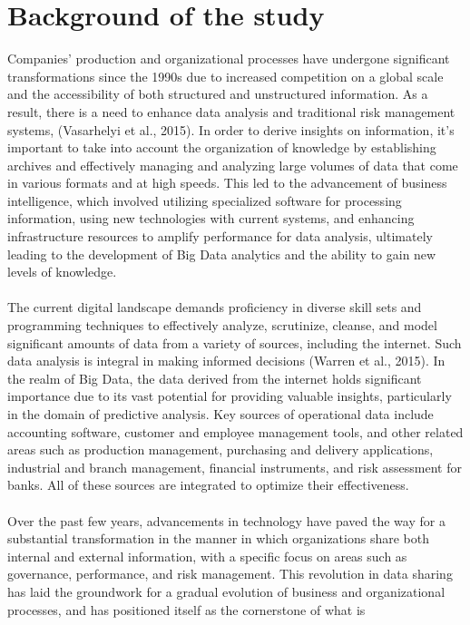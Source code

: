 \section{Background of the study}

Companies' production and organizational processes have undergone significant
transformations since the 1990s due to increased competition on a global scale and the
accessibility of both structured and unstructured information. As a result, there is a need to
enhance data analysis and traditional risk management systems, (Vasarhelyi et al., 2015). In order
to derive insights on information, it's important to take into account the organization of
knowledge by establishing archives and effectively managing and analyzing large volumes of
data that come in various formats and at high speeds. This led to the advancement of business
intelligence, which involved utilizing specialized software for processing information, using
new technologies with current systems, and enhancing infrastructure resources to amplify 
performance for data analysis, ultimately leading to the development of
Big Data analytics and the ability to gain new levels of knowledge.\\\\
The current digital landscape demands proficiency in diverse skill sets and programming
techniques to effectively analyze, scrutinize, cleanse, and model significant amounts of data
from a variety of sources, including the internet. Such data analysis is integral in making
informed decisions (Warren et al., 2015). In the realm of Big Data, the data derived from the
internet holds significant importance due to its vast potential for providing valuable insights,
particularly in the domain of predictive analysis. Key sources of operational data include accounting software,
 customer and employee management tools, and other related areas such as production management, purchasing and
  delivery applications, industrial and branch management, financial instruments, and risk assessment for banks.
   All of these sources are integrated to optimize their effectiveness.\\\\
Over the past few years, advancements in technology have paved the way for a substantial
transformation in the manner in which organizations share both internal and external
information, with a specific focus on areas such as governance, performance, and risk
management. This revolution in data sharing has laid the groundwork for a gradual evolution of
business and organizational processes, and has positioned itself as the cornerstone of what is
